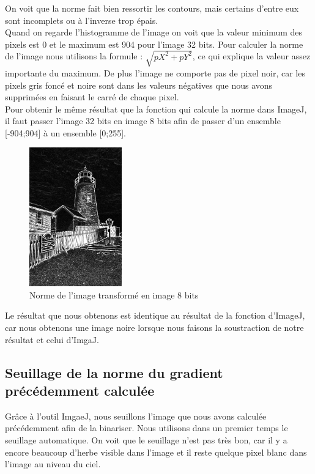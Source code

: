 \documentclass[a4paper,11pt]{article}
\begin{document}
  On voit que la norme fait bien ressortir les contours, mais certains d'entre eux sont incomplets
  ou à l'inverse trop épais.\\

  Quand on regarde l'histogramme de l'image on voit que la valeur minimum des pixels est 0
  et le maximum est 904 pour l'image 32 bits. Pour calculer la norme de l'image nous utilisons
  la formule : $\sqrt{pX^2 + pY^2}$, ce qui explique la valeur assez importante du maximum. De plus
  l'image ne comporte pas de pixel noir, car les pixels gris foncé et noire sont dans les valeurs négatives
  que nous avons supprimées en faisant le carré de chaque pixel.\\

  Pour obtenir le même résultat que la fonction qui calcule la norme dans ImageJ, il faut passer
  l'image 32 bits en image 8 bits afin de passer d'un ensemble [-904;904] à un ensemble [0;255].\\
  
  \begin{figure}[H]
  \center
   \includegraphics[width=4cm]{../norme8.png}
   \caption{Norme de l'image transformé en image 8 bits}
  \end{figure}
  
  Le résultat que nous obtenons est identique au résultat de la fonction d'ImageJ, car nous obtenons
  une image noire lorsque nous faisons la soustraction de notre résultat et celui d'ImgaJ.
  
  \subsection{Seuillage de la norme du gradient précédemment calculée}
  Grâce à l'outil ImgaeJ, nous seuillons l'image que nous avons calculée précédemment afin de la binariser.
  Nous utilisons dans un premier temps le seuillage automatique. On voit que le seuillage n'est pas très bon,
  car il y a encore beaucoup d'herbe visible dans l'image et il reste quelque pixel blanc dans l'image au niveau du ciel.\\
  
\end{document}
